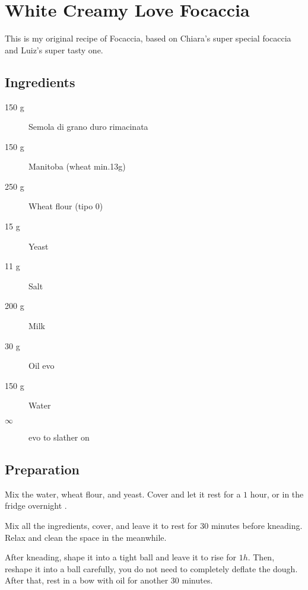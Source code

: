 \setchapterpreamble[u]{\margintoc}
\chapter{White Creamy Love Focaccia}

This is my original recipe of Focaccia, based on Chiara's super special focaccia and Luiz's super tasty one.

\section{Ingredients}

\begin{multicols}{2}
\begin{description}
	\item[150 g] Semola di grano duro rimacinata
	\item[150 g] Manitoba (wheat min.13g)
	\item[250 g] Wheat flour (tipo 0)
	
	\item[15 g] Yeast
	\item[11 g] Salt
	\item[200 g] Milk
	\item[30 g] Oil \gls{evo}
	
	
	\item[150 g] Water
	\item[$\infty$] \gls{evo} to slather on
\end{description}
\end{multicols}	

\section{Preparation}
Mix the water, wheat flour, and yeast.
%
Cover and let it rest for a $1$ hour, or in the fridge overnight .

Mix all the ingredients, cover, and leave it to rest for $30$ minutes before kneading.
%
Relax and clean the space in the meanwhile.

After kneading, shape it into a tight ball and leave it to rise for $1h$.
%
Then, reshape it into a ball carefully, you do not need to completely deflate the dough.
%
After that, rest in a bow with oil for another $30$ minutes.

